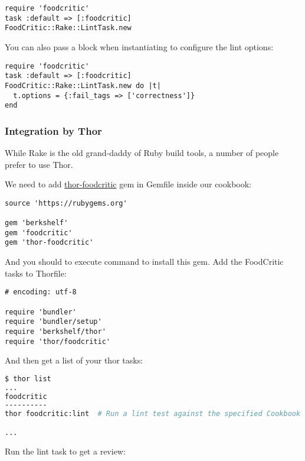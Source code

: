 \begin{lstlisting}[label=lst:testing-rake1]
require 'foodcritic'
task :default => [:foodcritic]
FoodCritic::Rake::LintTask.new
\end{lstlisting}

You can also pass a block when instantiating to configure the lint options:

\begin{lstlisting}[label=lst:testing-rake2]
require 'foodcritic'
task :default => [:foodcritic]
FoodCritic::Rake::LintTask.new do |t|
  t.options = {:fail_tags => ['correctness']}
end
\end{lstlisting}

\subsubsection{Integration by Thor}

While Rake is the old grand-daddy of Ruby build tools, a number of people prefer to use Thor.

We need to add \href{https://github.com/reset/thor-foodcritic}{thor-foodcritic} gem in Gemfile inside our  cookbook:

\begin{lstlisting}[label=lst:testing-thor1]
source 'https://rubygems.org'

gem 'berkshelf'
gem 'foodcritic'
gem 'thor-foodcritic'
\end{lstlisting}

And you should to execute  command to install this gem. Add the FoodCritic tasks to Thorfile:

\begin{lstlisting}[label=lst:testing-thor2]
# encoding: utf-8

require 'bundler'
require 'bundler/setup'
require 'berkshelf/thor'
require 'thor/foodcritic'
\end{lstlisting}

And then get a list of your thor tasks:

\begin{lstlisting}[language=Bash,label=lst:testing-thor3]
$ thor list
...
foodcritic
----------
thor foodcritic:lint  # Run a lint test against the specified Cookbook and Role paths or otherwise your current working directory.

...
\end{lstlisting}

Run the lint task to get a review:

